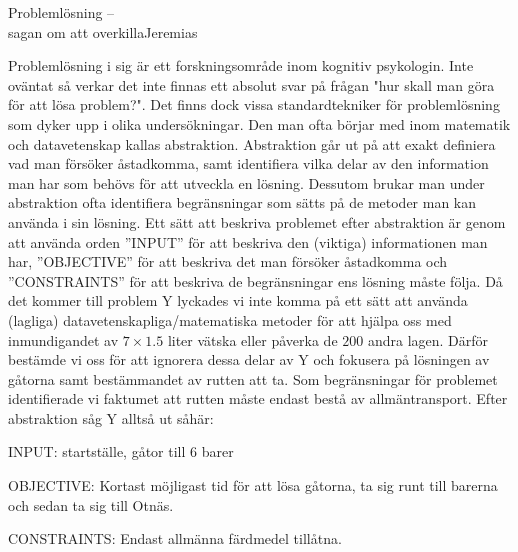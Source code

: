 \documentclass{spektraklet}
\begin{document}
\begin{artikel}{Problemlösning – \\ sagan om att overkilla}{Jeremias}
\begin{twocolumns}
Problemlösning i sig är ett forskningsområde inom kognitiv psykologin. Inte oväntat så verkar det inte finnas ett absolut svar på frågan "hur skall man göra för att lösa problem?". Det finns dock vissa standardtekniker för problemlösning som dyker upp i olika undersökningar. Den man ofta börjar med inom matematik och datavetenskap kallas abstraktion. Abstraktion går ut på att exakt definiera vad man försöker åstadkomma, samt identifiera vilka delar av den information man har som behövs för att utveckla en lösning. Dessutom brukar man under abstraktion ofta identifiera begränsningar som sätts på de metoder man kan använda i sin lösning. Ett sätt att beskriva problemet efter abstraktion är genom att använda orden ''INPUT'' för att beskriva den (viktiga) informationen man har, ''OBJECTIVE'' för att beskriva det man försöker åstadkomma och ''CONSTRAINTS'' för att beskriva de begränsningar ens lösning måste följa. Då det kommer till problem Y lyckades vi inte komma på ett sätt att använda (lagliga) datavetenskapliga/matematiska metoder för att hjälpa oss med inmundigandet av $7 \times 1.5$ liter vätska eller påverka de $200$ andra lagen. Därför bestämde vi oss för att ignorera dessa delar av Y och fokusera på lösningen av gåtorna samt bestämmandet av rutten att ta. Som begränsningar för problemet identifierade vi faktumet att rutten måste endast bestå av allmäntransport. Efter abstraktion såg Y alltså ut såhär:

INPUT: startställe, gåtor till 6 barer

OBJECTIVE: Kortast möjligast tid för att lösa gåtorna, ta sig runt till barerna och sedan ta sig till Otnäs.

CONSTRAINTS: Endast allmänna färdmedel tillåtna.


\end{twocolumns}
\end{artikel}
\end{document}
